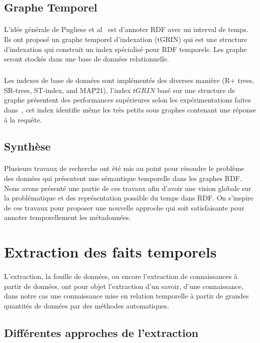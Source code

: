 \subsection{Graphe Temporel}
\paragraph{}
L'idée générale de Pugliese et al~\cite{pugliese2008} est d'annoter RDF avec un interval de temps.
Ils ont proposé un graphe temporel d'indexation (tGRIN) qui est une structure d’indexation qui construit un index spécialisé pour RDF temporels. Les graphe seront stockés dans une base de données relationnelle.
\subparagraph{}
Les indexes de base de données sont implémentés des diverses manière (R+ trees, SR-trees, ST-index, and MAP21), l'index $tGRIN$ basé sur une structure de graphe présentent des performances supérieures selon les expérimentations faites dans~\cite{pugliese2008}, cet index identifie même les très petits sous graphes contenant une réponse à la requête.
\subsection{Synthèse}
\paragraph{}
Plusieurs travaux de recherche ont été mis au point pour résoudre le problème des données qui présentent une sémantique temporelle dans les graphes RDF. Nous avons présenté une partie de ces travaux afin d'avoir une vision globale sur la problématique et des représentation possible du temps dans RDF. On s'inspire de ces travaux pour proposer une nouvelle approche qui soit satisfaisante pour annoter temporellement les métadonnées.
\newpage
\section{Extraction des faits temporels}
\paragraph{}
L'extraction, la fouille de données, ou encore l'extraction de connaissances à partir de données, ont pour objet l'extraction d'un savoir, d'une connaissance, dans notre cas une connaissance mise en relation temporelle à partir de grandes quantités de données par des méthodes automatiques.
\subsection{Différentes approches de l'extraction }
